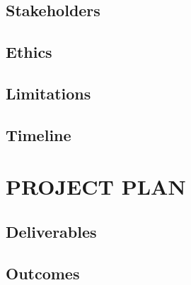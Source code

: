 \documentclass[a4paper, 10pt, conference]{article}
\begin{document}

\subsection{Stakeholders} 




\subsection{Ethics}





\subsection{Limitations}



\subsection{Timeline}




\section{PROJECT PLAN}



\subsection{Deliverables}




\subsection{Outcomes}
\end{document}

